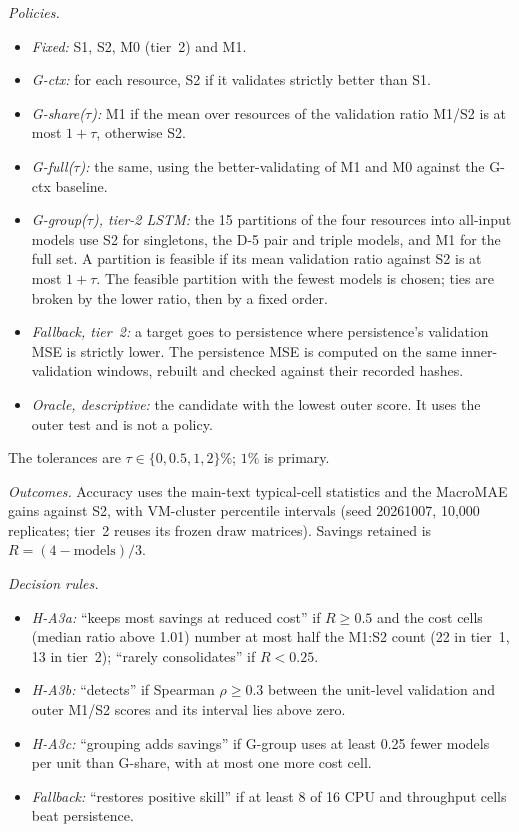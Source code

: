 \documentclass[a4paper,11pt]{article}
\begin{document}
\emph{Policies.}
\begin{itemize}
  \item \emph{Fixed:} S1, S2, M0 (tier~2) and M1.
  \item \emph{G-ctx:} for each resource, S2 if it validates strictly better than S1.
  \item \emph{G-share($\tau$):} M1 if the mean over resources of the validation ratio M1/S2 is at most
    $1+\tau$, otherwise S2.
  \item \emph{G-full($\tau$):} the same, using the better-validating of M1 and M0 against the G-ctx baseline.
  \item \emph{G-group($\tau$), tier-2 LSTM:} the 15 partitions of the four resources into all-input models use
    S2 for singletons, the D-5 pair and triple models, and M1 for the full set. A partition is feasible if its
    mean validation ratio against S2 is at most $1+\tau$. The feasible partition with the fewest models is chosen;
    ties are broken by the lower ratio, then by a fixed order.
  \item \emph{Fallback, tier~2:} a target goes to persistence where persistence's validation MSE is strictly
    lower. The persistence MSE is computed on the same inner-validation windows, rebuilt and checked against their
    recorded hashes.
  \item \emph{Oracle, descriptive:} the candidate with the lowest outer score. It uses the outer test and is not a
    policy.
\end{itemize}
The tolerances are $\tau\in\{0,0.5,1,2\}\%$; $1\%$ is primary.

\emph{Outcomes.} Accuracy uses the main-text typical-cell statistics and the MacroMAE gains against S2, with
VM-cluster percentile intervals (seed 20261007, 10{,}000 replicates; tier~2 reuses its frozen draw matrices).
Savings retained is $R=(4-\text{models})/3$.

\emph{Decision rules.}
\begin{itemize}
  \item \emph{H-A3a:} ``keeps most savings at reduced cost'' if $R\ge0.5$ and the cost cells (median ratio above
    1.01) number at most half the M1:S2 count (22 in tier~1, 13 in tier~2); ``rarely consolidates'' if $R<0.25$.
  \item \emph{H-A3b:} ``detects'' if Spearman $\rho\ge0.3$ between the unit-level validation and outer M1/S2
    scores and its interval lies above zero.
  \item \emph{H-A3c:} ``grouping adds savings'' if G-group uses at least 0.25 fewer models per unit than G-share,
    with at most one more cost cell.
  \item \emph{Fallback:} ``restores positive skill'' if at least 8 of 16 CPU and throughput cells beat persistence.
\end{itemize}
\end{document}
